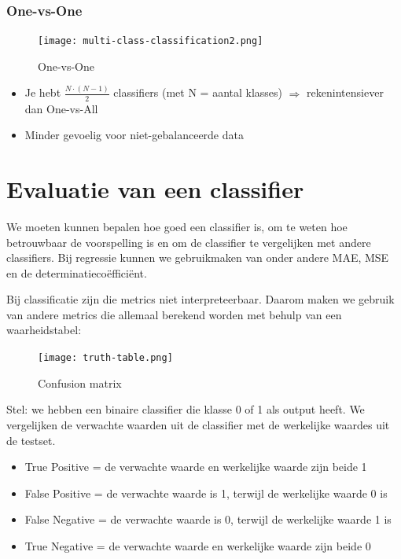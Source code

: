 \documentclass{article}
\begin{document}
\subsubsection{One-vs-One}

\begin{figure}[H]
    \centering
    \texttt{[image: multi-class-classification2.png]}
    \caption{One-vs-One}
\end{figure}

\begin{itemize}
    \item Je hebt $\frac{N\cdot(N-1)}{2}$ classifiers (met N = aantal klasses) $\Rightarrow$ rekenintensiever dan One-vs-All
    \item Minder gevoelig voor niet-gebalanceerde data
\end{itemize}

\section{Evaluatie van een classifier}

We moeten kunnen bepalen hoe goed een classifier is, om te weten hoe betrouwbaar de voorspelling is
en om de classifier te vergelijken met andere classifiers. 
Bij regressie kunnen we gebruikmaken van onder andere MAE, MSE en de determinatiecoëfficiënt.
 
Bij classificatie zijn die metrics niet interpreteerbaar. 
Daarom maken we gebruik van andere metrics die allemaal berekend worden met behulp van een waarheidstabel:

\begin{figure}[H]
    \centering
    \texttt{[image: truth-table.png]}
    \caption{Confusion matrix}
\end{figure}

Stel: we hebben een binaire classifier die klasse 0 of 1 als output heeft.
We vergelijken de verwachte waarden uit de classifier met de werkelijke waardes uit de testset.

\begin{itemize}
    \item True Positive = de verwachte waarde en werkelijke waarde zijn beide 1
    \item False Positive = de verwachte waarde is 1, terwijl de werkelijke waarde 0 is
    \item False Negative = de verwachte waarde is 0, terwijl de werkelijke waarde 1 is
    \item True Negative = de verwachte waarde en werkelijke waarde zijn beide 0
\end{itemize}
\end{document}
